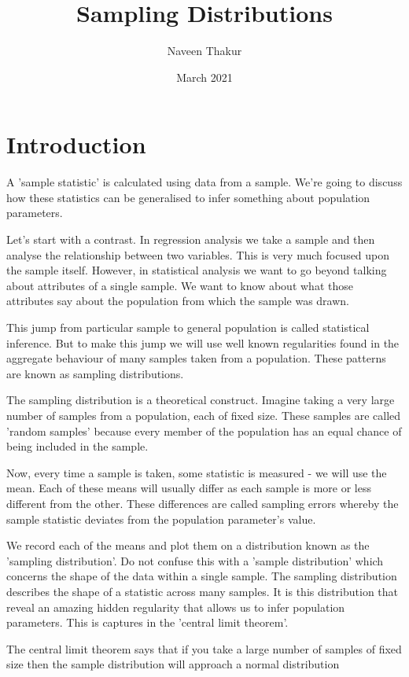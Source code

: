 \documentclass{article}
\title{Sampling Distributions}
\author{Naveen Thakur }
\date{March 2021}
\begin{document}
\maketitle

\section{Introduction}
A 'sample statistic' is calculated using data from a sample. We're going to discuss how these statistics can be generalised to infer something about population parameters.

Let's start with a contrast. In regression analysis we take a sample and then analyse the relationship between two variables. This is very much focused upon the sample itself. However, in statistical analysis we want to go beyond talking about attributes of a single sample. We want to know about what those attributes say about the population from which the sample was drawn.

This jump from particular sample to general population is called statistical inference. But to make this jump we will use well known regularities found in the aggregate behaviour of many samples taken from a population. These patterns are known as sampling distributions.

The sampling distribution is a theoretical construct. Imagine taking a very large number of samples from a population, each of fixed size. These samples are called 'random samples' because every member of the population has an equal chance of being included in the sample. 

Now, every time a sample is taken, some statistic is measured - we will use the mean. Each of these means will usually differ as each sample is more or less different from the other. These differences are called sampling errors whereby the sample statistic deviates from the population parameter's value.

We record each of the means and plot them on a distribution known as the 'sampling distribution'. Do not confuse this with a 'sample distribution' which concerns the shape of the data within a single sample. The sampling distribution describes the shape of a statistic across many samples. It is this distribution that reveal an amazing hidden regularity that allows us to infer population parameters. This is captures in the 'central limit theorem'.

The central limit theorem says that if you take a large number of samples of fixed size then the sample distribution will approach a normal distribution
\end{document}
